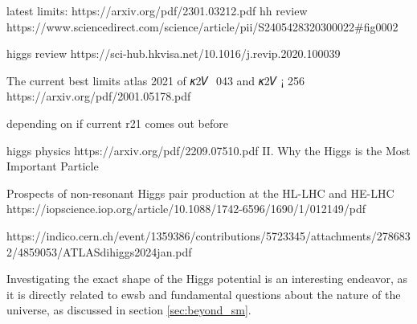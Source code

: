 latest limits: https://arxiv.org/pdf/2301.03212.pdf 
hh review 
https://www.sciencedirect.com/science/article/pii/S2405428320300022#fig0002

higgs review
https://sci-hub.hkvisa.net/10.1016/j.revip.2020.100039

The current best limits 
atlas 2021 
of 𝜅2𝑉  043 and 𝜅2𝑉 ¡ 256
https://arxiv.org/pdf/2001.05178.pdf 

depending on if current r21 comes out before
    

higgs physics
https://arxiv.org/pdf/2209.07510.pdf 
II. Why the Higgs is the Most Important Particle



Prospects of non-resonant Higgs pair production
at the HL-LHC and HE-LHC
https://iopscience.iop.org/article/10.1088/1742-6596/1690/1/012149/pdf


https://indico.cern.ch/event/1359386/contributions/5723345/attachments/2786832/4859053/ATLASdihiggs2024jan.pdf 


Investigating the exact shape of the Higgs potential is an interesting endeavor, as it is directly related to \ac{ewsb} and fundamental questions about the nature of the universe, as discussed in section \ref{sec:beyond_sm}. 